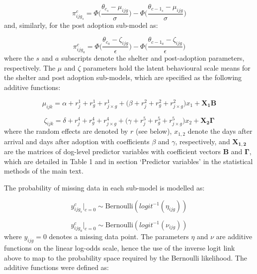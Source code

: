\documentclass[12pt]{article}
\begin{document}
\begin{equation}
  \pi_{ijg_{s}}^c = \Phi \Big( \frac{\theta_{c_{s}} - \mu_{ijg}}{\sigma} \Big) - \Phi \Big( \frac{\theta_{c-1_{s}} - \mu_{ijg}}{\sigma} \Big)
  \label{eq_ordprob_shelter}
\end{equation}
%
and, similarly, for the post adoption sub-model as:

\begin{equation}
  \pi_{ijg_{a}}^c = \Phi \Big( \frac{\theta_{c_{a}} - \zeta_{ijg}}{\epsilon} \Big) - \Phi \Big( \frac{\theta_{c-1_{a}} - \zeta_{ijg}}{\epsilon} \Big)
  \label{eq_ordprob_adoption}
\end{equation}
%
where the $s$ and $a$ subscripts denote the shelter and post-adoption parameters, respectively. The $\mu$ and $\zeta$ parameters hold the latent behavioural scale means for the shelter and post adoption sub-models, which are specified as the following additive functions:

\begin{equation}
  \mu_{ijk} = \alpha + r_{j}^{1} + r_{g}^{1} + r_{j \times g}^{1} +
              \big(\beta +  r_{j}^{2} + r_{g}^{2} + r_{j \times g}^{2}\big) x_{1} + \mathbf{X_{1}} \mathbf{B}
\end{equation}

\begin{equation}
  \zeta_{ijk} = \delta + r_{j}^{4} + r_{g}^{4} + r_{j \times g}^{4} +
              \big(\gamma +  r_{j}^{5} + r_{g}^{5} + r_{j \times g}^{5}\big) x_{2} + \mathbf{X_{2}} \mathbf{\Gamma}
\end{equation}
%
where the random effects are denoted by $r$ (see below), $x_{1,2}$ denote the days after arrival and days after adoption with coefficients $\beta$ and $\gamma$, respectively, and $\mathbf{X_{1,2}}$ are the matrices of dog-level predictor variables with coefficient vectors $\mathbf{B}$ and $\mathbf{\Gamma}$, which are detailed in Table 1 and in section `Predictor variables' in the statistical methods of the main text.

The probability of missing data in each sub-model is modelled as:

\begin{equation}
  y_{ijg_{s}}^{c} \big|_{c=0} \sim \text{Bernoulli}( logit^{-1}(\eta_{ijg}))
  \label{eq_missing_shelter}
\end{equation}

\begin{equation}
  y_{ijg_{a}}^{c} \big|_{c=0} \sim \text{Bernoulli}( logit^{-1}(\nu_{ijg}))
  \label{eq_missing_adoption}
\end{equation}
%
where $y_{ijg} = 0$ denotes a missing data point. The parameters $\eta$ and $\nu$ are additive functions on the linear log-odds scale, hence the use of the inverse logit link above to map to the probability space required by the Bernoulli likelihood. The additive functions were defined as:
\end{document}
